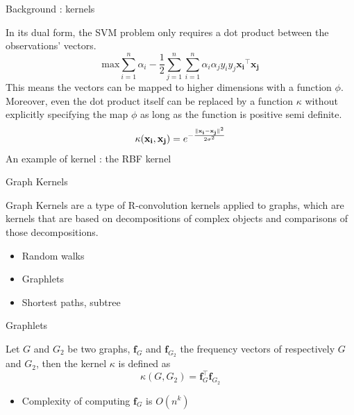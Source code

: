 \documentclass[compress]{beamer}
\DeclarePairedDelimiter{\norm}{\lVert}{\rVert}
\let\vec\mathbf
\begin{document}
\begin{frame}{Background : kernels}
	\begin{definition}
		In its dual form, the SVM problem only requires a dot product between the observations' vectors. 
		\begin{equation*}
		\text{max} \sum\limits_{i=1}^{n} \alpha_i - \frac{1}{2} \sum\limits_{j=1}^{n}\sum\limits_{i=1}^{n}\alpha_{i}\alpha_{j}y_{i}y_{j}\vec{x_{i}}^{\top}\vec{x_{j}}
		\end{equation*}
		This means the vectors can be mapped to higher dimensions with a function $\phi$. Moreover, even the dot product itself can be replaced by a function $\kappa$ without explicitly specifying the map $\phi$ as long as the function is positive semi definite.
		\begin{equation*}
		\kappa(\vec{x_{i}},\vec{x_{j}})={e}^{-\frac{\norm{\vec{x_{i}}-\vec{x_{j}}}^{2}}{2\sigma^{2}}}
		\end{equation*}
		\centering
		An example of kernel : the RBF kernel
	\end{definition}
\end{frame}
\begin{frame}{Graph Kernels}
    \begin{definition}
    	Graph Kernels are a type of R-convolution kernels\cite{haussler99convolution} applied to graphs, which are kernels that are based on decompositions of complex objects and comparisons of those decompositions.
    \end{definition}
	\begin{itemize}
		\item Random walks
		\item Graphlets
		\item Shortest paths, subtree
	\end{itemize}
\end{frame}
\begin{frame}{Graphlets}
    \begin{definition}
   		Let $G$ and $G_2$ be two graphs, $\vec{f}_G$ and $\vec{f}_{G_2}$ the frequency vectors of respectively $G$ and $G_2$, then the kernel $\kappa$ is defined as
   		\begin{equation*}
   		\kappa(G,G_{2})=\vec{f}_{G}^{\top}\vec{f}_{G_2}
   		\end{equation*}
    \end{definition}
	\begin{itemize}
		\item Complexity of computing $\vec{f}_G$ is $O(n^k)$
	\end{itemize}
\end{frame}
\end{document}
